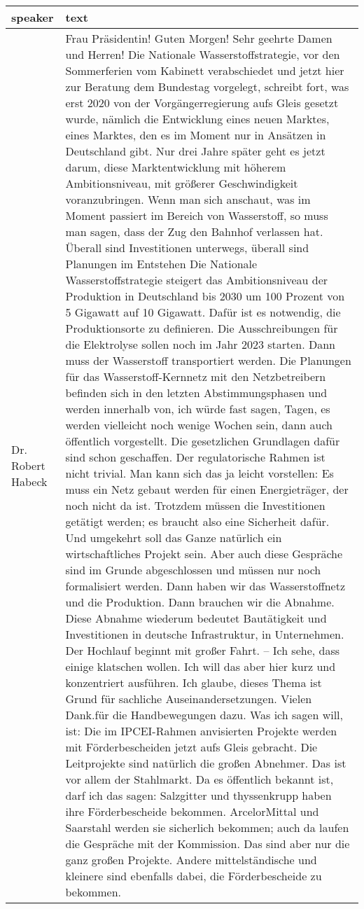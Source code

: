 \documentclass[
]{article}
\begin{document}
\begin{table}
\centering
\begin{tabular}[t]{l|>{\raggedright\arraybackslash}p{300in}}
\hline
speaker & text\\
\hline
Dr. Robert Habeck & Frau Präsidentin! Guten Morgen! Sehr geehrte Damen und Herren! Die Nationale Wasserstoffstrategie, vor den Sommerferien vom Kabinett verabschiedet und jetzt hier zur Beratung dem Bundestag vorgelegt, schreibt fort, was erst 2020 von der Vorgängerregierung aufs Gleis gesetzt wurde, nämlich die Entwicklung eines neuen Marktes, eines Marktes, den es im Moment nur in Ansätzen in Deutschland gibt. Nur drei Jahre später geht es jetzt darum, diese Marktentwicklung mit höherem Ambitionsniveau, mit größerer Geschwindigkeit voranzubringen.
Wenn man sich anschaut, was im Moment passiert im Bereich von Wasserstoff, so muss man sagen, dass der Zug den Bahnhof verlassen hat. Überall sind Investitionen unterwegs, überall sind Planungen im Entstehen
Die Nationale Wasserstoffstrategie steigert das Ambitionsniveau der Produktion in Deutschland bis 2030 um 100 Prozent von 5 Gigawatt auf 10 Gigawatt. Dafür ist es notwendig, die Produktionsorte zu definieren. Die Ausschreibungen für die Elektrolyse sollen noch im Jahr 2023 starten.
Dann muss der Wasserstoff transportiert werden. Die Planungen für das Wasserstoff-Kernnetz mit den Netzbetreibern befinden sich in den letzten Abstimmungsphasen und werden innerhalb von, ich würde fast sagen, Tagen, es werden vielleicht noch wenige Wochen sein, dann auch öffentlich vorgestellt. Die gesetzlichen Grundlagen dafür sind schon geschaffen.
Der regulatorische Rahmen ist nicht trivial. Man kann sich das ja leicht vorstellen: Es muss ein Netz gebaut werden für einen Energieträger, der noch nicht da ist. Trotzdem müssen die Investitionen getätigt werden; es braucht also eine Sicherheit dafür. Und umgekehrt soll das Ganze natürlich ein wirtschaftliches Projekt sein. Aber auch diese Gespräche sind im Grunde abgeschlossen und müssen nur noch formalisiert werden.
Dann haben wir das Wasserstoffnetz und die Produktion. Dann brauchen wir die Abnahme. Diese Abnahme wiederum bedeutet Bautätigkeit und Investitionen in deutsche Infrastruktur, in Unternehmen. Der Hochlauf beginnt mit großer Fahrt. – Ich sehe, dass einige klatschen wollen. Ich will das aber hier kurz und konzentriert ausführen. Ich glaube, dieses Thema ist Grund für sachliche Auseinandersetzungen. Vielen Dank.für die Handbewegungen dazu.
Was ich sagen will, ist: Die im IPCEI-Rahmen anvisierten Projekte werden mit Förderbescheiden jetzt aufs Gleis gebracht. Die Leitprojekte sind natürlich die großen Abnehmer. Das ist vor allem der Stahlmarkt. Da es öffentlich bekannt ist, darf ich das sagen: Salzgitter und thyssenkrupp haben ihre Förderbescheide bekommen. ArcelorMittal und Saarstahl werden sie sicherlich bekommen; auch da laufen die Gespräche mit der Kommission. Das sind aber nur die ganz großen Projekte. Andere mittelständische und kleinere sind ebenfalls dabei, die Förderbescheide zu bekommen.

\end{tabular}
\end{table}
\end{document}
